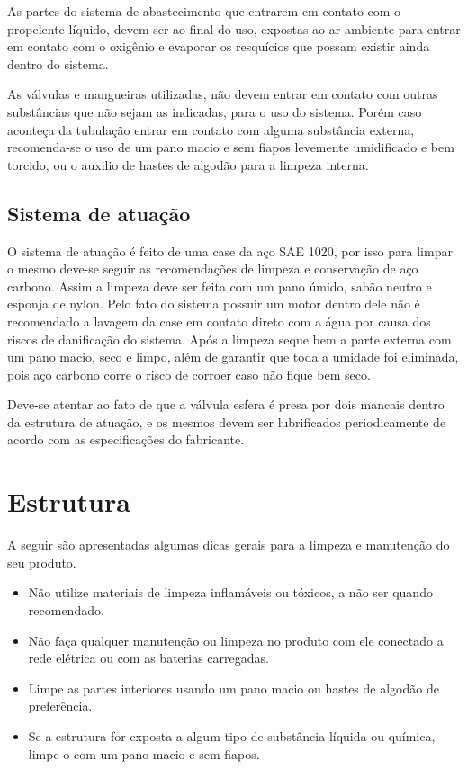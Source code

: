 \par As partes do sistema de abastecimento que entrarem em contato com o propelente líquido, devem ser ao final do uso, expostas ao ar ambiente para entrar em contato com o oxigênio e evaporar os resquícios que possam existir ainda dentro do sistema. 

\par As válvulas e mangueiras utilizadas, não devem entrar em contato com outras substâncias que não sejam as indicadas, para o uso do sistema. Porém caso aconteça da tubulação entrar em contato com alguma substância externa, recomenda-se o uso de um pano macio e sem fiapos levemente umidificado e bem torcido, ou o auxilio de hastes de algodão para a limpeza interna.

\subsection*{Sistema de atuação}

\par O sistema de atuação é feito de uma case da aço SAE 1020, por isso para limpar o mesmo deve-se seguir as recomendações de limpeza e conservação de aço carbono. Assim a limpeza deve ser feita com um pano úmido, sabão neutro e esponja de nylon. Pelo fato do sistema possuir um motor dentro dele não é recomendado a lavagem da case em contato direto com a água por causa dos riscos de danificação do sistema. Após a limpeza seque bem a parte externa com um pano macio, seco e limpo, além de garantir que toda a umidade foi eliminada, pois aço carbono corre o risco de corroer caso não fique bem seco.

\par Deve-se atentar ao fato de que a válvula esfera é presa por dois mancais dentro da estrutura de atuação, e os mesmos devem ser lubrificados periodicamente de acordo com as especificações do fabricante.

\section*{Estrutura}

\par A seguir são apresentadas algumas dicas gerais para a limpeza e manutenção do seu produto.

\begin{itemize}
    \item Não utilize materiais de limpeza inflamáveis ou tóxicos, a não ser quando recomendado.
    \item Não faça qualquer manutenção ou limpeza no produto com ele conectado a rede elétrica ou com as baterias carregadas.
    \item Limpe as partes interiores usando um pano macio ou hastes de algodão de preferência.
    \item Se a estrutura for exposta a algum tipo de substância líquida ou química, limpe-o com um pano macio e sem fiapos.
\end{itemize}

